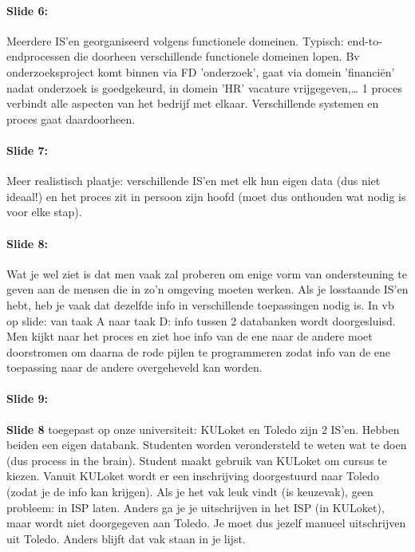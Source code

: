 \documentclass[10pt,a4paper]{report}
\begin{document}
\paragraph{Slide 6:}Meerdere IS'en georganiseerd volgens functionele domeinen. Typisch: end-to-endprocessen die doorheen verschillende functionele domeinen lopen. Bv onderzoeksproject komt binnen via FD 'onderzoek', gaat via domein 'financiën' nadat onderzoek is goedgekeurd, in domein 'HR' vacature vrijgegeven,… 1 proces verbindt alle aspecten van het bedrijf met elkaar.
Verschillende systemen en proces gaat daardoorheen.

\paragraph{Slide 7:}Meer realistisch plaatje: verschillende IS'en met elk hun eigen data (dus niet ideaal!) en het proces zit in persoon zijn hoofd (moet dus onthouden wat nodig is voor elke stap).

\paragraph{Slide 8:}Wat je wel ziet is dat men vaak zal proberen om enige vorm van ondersteuning te geven aan de mensen die in zo'n omgeving moeten werken. Als je losstaande IS'en hebt, heb je vaak dat dezelfde info in verschillende toepassingen nodig is. In vb op slide: van taak A naar taak D: info tussen 2 databanken wordt doorgesluisd. Men kijkt naar het proces en ziet hoe info van de ene naar de andere moet doorstromen om daarna de rode pijlen te programmeren zodat info van de ene toepassing naar de andere overgeheveld kan worden.

\paragraph{Slide 9:}\textbf{Slide 8} toegepast op onze universiteit: KULoket en Toledo zijn 2 IS'en. Hebben beiden een eigen databank. Studenten worden verondersteld te weten wat te doen (dus process in the brain). Student maakt gebruik van KULoket om cursus te kiezen. Vanuit KULoket wordt er een inschrijving doorgestuurd naar Toledo (zodat je de info kan krijgen). Als je het vak leuk vindt (is keuzevak), geen probleem: in ISP laten. Anders ga je je uitschrijven in het ISP (in KULoket), maar wordt niet doorgegeven aan Toledo. Je moet dus jezelf manueel uitschrijven uit Toledo. Anders blijft dat vak staan in je lijst.
\end{document}
